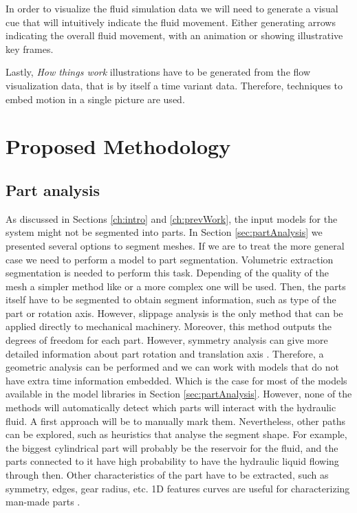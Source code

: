 In order to visualize the fluid simulation data we will need to generate a visual cue that will intuitively indicate the fluid movement.
Either generating arrows indicating the overall fluid movement, with an animation or showing illustrative key frames.

Lastly, \textit{How things work} illustrations have to be generated from the flow visualization data, that is by itself a time variant data.
Therefore, techniques to embed motion in a single picture are used.


\section{Proposed Methodology}

\subsection{Part analysis}

As discussed in Sections \ref{ch:intro} and \ref{ch:prevWork}, the input models for the system might not be segmented into parts.
In Section \ref{sec:partAnalysis} we presented several options to segment meshes.
If we are to treat the more general case we need to perform a model to part segmentation.
Volumetric extraction segmentation is needed to perform this task.
Depending of the quality of the mesh a simpler method like \cite{Attene2006} or a more complex one \cite{Yumer2012} will be used.
Then, the parts itself have to be segmented to obtain segment information, such as type of the part or rotation axis.
However, slippage analysis \cite{Yi2014} is the only method that can be applied directly to mechanical machinery.
Moreover, this method outputs the degrees of freedom for each part.
However, symmetry analysis can give more detailed information about part rotation and translation axis \cite{Mitra2007}.
Therefore, a geometric analysis can be performed and we can work with models that do not have extra time information embedded.
Which is the case for most of the models available in the model libraries in Section \ref{sec:partAnalysis}.
However, none of the methods will automatically detect which parts will interact with the hydraulic fluid.
A first approach will be to manually mark them.
Nevertheless, other paths can be explored, such as heuristics that analyse the segment shape.
For example, the biggest cylindrical part will probably be the reservoir for the fluid, and the parts connected to it have high probability to have the hydraulic liquid flowing through then.
Other characteristics of the part have to be extracted, such as symmetry, edges, gear radius, etc.
1D features curves are useful for characterizing man-made parts \cite{Gal2009}.


